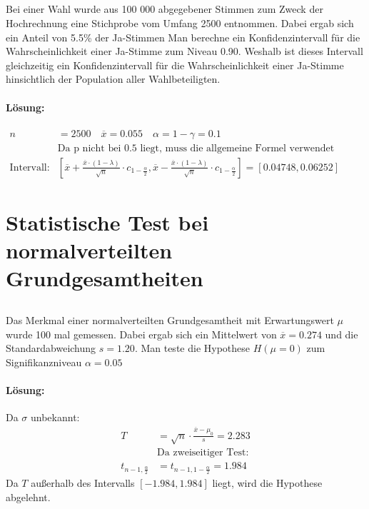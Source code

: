 \documentclass[ngerman]{scrartcl}
\begin{document}
\subsection{}
Bei einer Wahl wurde aus 100 000 abgegebener Stimmen zum Zweck der Hochrechnung eine Stichprobe vom Umfang 2500 entnommen. Dabei ergab sich ein Anteil von 5.5\% der Ja-Stimmen Man berechne ein Konfidenzintervall für die Wahrscheinlichkeit einer Ja-Stimme zum Niveau 0.90. Weshalb ist dieses Intervall gleichzeitig ein Konfidenzintervall für die Wahrscheinlichkeit einer Ja-Stimme hinsichtlich der Population aller Wahlbeteiligten.
\paragraph{Lösung:}
\begin{align*}
n &=2500\quad \overline{x} = 0.055\quad \alpha = 1 - \gamma = 0.1\\
&\text{Da p nicht bei 0.5 liegt,  muss die allgemeine Formel verwendet werden:}\\	
\text{Intervall:} & \left[\overline{x}+\frac{\overline{x}\cdot (1-\lambda)}{\sqrt{n}}\cdot c_{1-\frac{\alpha}{2}}, \overline{x}-\frac{\overline{x}\cdot (1-\lambda)}{\sqrt{n}}\cdot c_{1-\frac{\alpha}{2}}\right] = \left[0.04748 , 0.06252\right]
\end{align*}

\section{Statistische Test bei normalverteilten Grundgesamtheiten}
\subsection{}
Das Merkmal einer normalverteilten Grundgesamtheit mit Erwartungswert $\mu$ wurde 100 mal gemessen. Dabei ergab sich ein Mittelwert von $\overline{x} = 0.274$ und die Standardabweichung $ s = 1.20$. Man teste die Hypothese $H(\mu=0)$ zum Signifikanzniveau $\alpha = 0.05$
\paragraph{Lösung:}
Da $\sigma$ unbekannt:
\begin{align*}
T &= \sqrt{n}\cdot \frac{\overline{x} - \mu_0}{s} = 2.283\\
&\text{Da zweiseitiger Test:}\\
t_{n-1, \frac{\alpha}{2}} &= t_{n-1, 1-\frac{\alpha}{2}} = 1.984
\end{align*}
Da $T$ außerhalb des Intervalls $\left[-1.984,1.984\right]$ liegt, wird die Hypothese abgelehnt.
\end{document}
